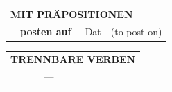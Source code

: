 \documentclass[10pt,a4paper]{revtex4-2}
\begin{document}
\begin{verbbox}
\vspace{10pt}

\begin{tabular}{lll}
\multicolumn{3}{l}{\textbf{MIT PRÄPOSITIONEN}}\\
& \textbf{posten auf} + Dat & (to post on)\\
\end{tabular}
\hfill
\begin{tabular}{lll}
\multicolumn{3}{l}{\textbf{TRENNBARE VERBEN}}\\
& ---\\
\end{tabular}

\vspace{-5pt}
\end{verbbox}
\end{document}
